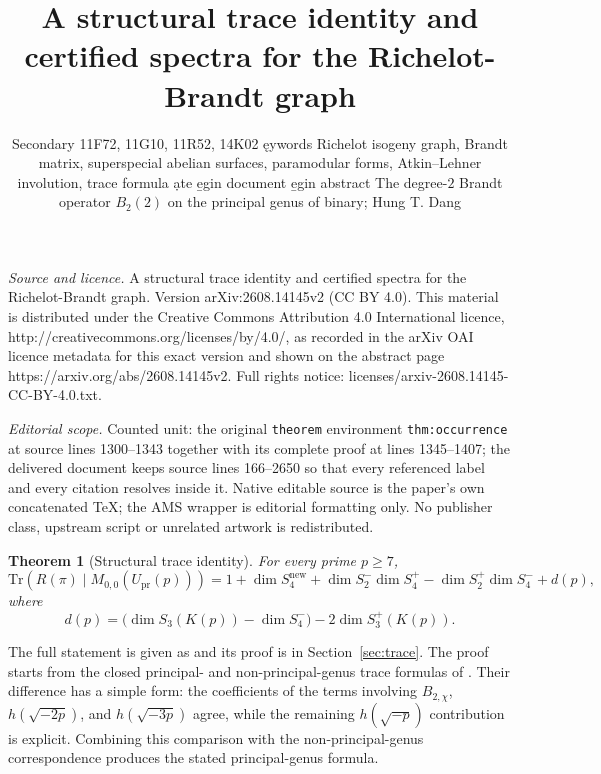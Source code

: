 \documentclass[10pt,a4paper]{amsart}
\newtheorem{theorem}{Theorem}[section]
\newcommand{\Tr}{\mathrm{Tr}}
\newcommand{\Upr}{U_{\mathrm{pr}}}
\newcommand{\snew}{S^{\mathrm{new}}}
\providecommand{\Upr}{U_{\mathrm{pr}}}
\providecommand{\snew}{S^{\mathrm{new}}}
\begin{document}
\title[A structural trace identity and certified spectra for the Ri]{A structural trace identity and certified spectra for the Richelot-Brandt graph}
\author{Secondary 11F72, 11G10, 11R52, 14K02 ęywords Richelot isogeny graph, Brandt matrix, superspecial abelian surfaces, paramodular forms, Atkin--Lehner involution, trace formula ạte e̱gin document e̱gin abstract The degree-$2$ Brandt operator $B_2(2)$ on the principal genus of binary; Hung T. Dang}
\date{}
\maketitle
\noindent\emph{Source and licence.} A structural trace identity and certified spectra for the Richelot-Brandt graph. Version arXiv:2608.14145v2 (CC BY 4.0). This material is distributed under the Creative Commons Attribution 4.0 International licence, http://creativecommons.org/licenses/by/4.0/, as recorded in the arXiv OAI licence metadata for this exact version and shown on the abstract page https://arxiv.org/abs/2608.14145v2. Full rights notice: licenses/arxiv-2608.14145-CC-BY-4.0.txt.\par\smallskip
\noindent\textit{Editorial scope.} Counted unit: the original \texttt{theorem} environment \texttt{thm:occurrence} at source lines 1300--1343 together with its complete proof at lines 1345--1407; the delivered document keeps source lines 166--2650 so that every referenced label and every citation resolves inside it. Native editable source is the paper's own concatenated TeX; the AMS wrapper is editorial formatting only. No publisher class, upstream script or unrelated artwork is redistributed.
	\begin{theorem}[Structural trace identity]\label{thm:structural-trace-intro}
		For every prime $p\ge7$,
		\[
		\Tr\!\left(R(\pi)\mid M_{0,0}(\Upr(p))\right)
		=
		1+\dim\snew_4
		+\dim S_2^-\dim S_4^+
		-\dim S_2^+\dim S_4^-
		+d(p),
		\]
		where
		\[
		d(p)=\bigl(\dim S_3(K(p))-\dim S_4^-\bigr)-2\dim S_3^+(K(p)).
		\]
	\end{theorem}
	The full statement is given as   and its proof is in Section~\ref{sec:trace}. The proof starts from the closed principal- and non-principal-genus trace
	formulas of \cite{IbukiyamaKatsura,Ibukiyama2019quinary}. Their difference
	has a simple form: the coefficients of the terms involving
	$B_{2,\chi}$, $h(\sqrt{-2p})$, and $h(\sqrt{-3p})$ agree, while the
	remaining $h(\sqrt{-p})$ contribution is explicit. Combining this
	comparison with the non-principal-genus correspondence produces the stated
	principal-genus formula.
	
\end{document}
